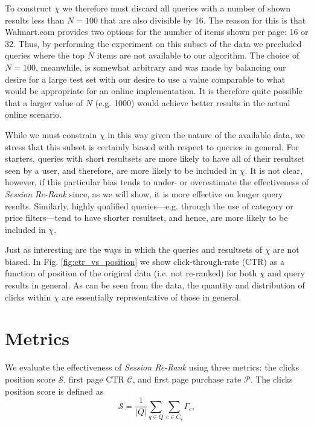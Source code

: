\documentclass{article}
\begin{document}
To construct $\chi$ we therefore must discard all queries with a number of
shown results less than $N=100$ that are also divisible by 16. The reason for 
this is that Walmart.com provides two options for the number of items shown per
page: 16 or 32. Thus, by performing the experiment on this subset of the data we
precluded queries where the top $N$ items are not available to our algorithm.
The choice of $N=100$, meanwhile, is somewhat arbitrary and was made by
balancing our desire for a large test set with our desire to use a value
comparable to what would be appropriate for an online implementation. It is
therefore quite possible that a
larger value of $N$ (e.g. 1000) would achieve better results in the actual
online scenario.

While we must constrain $\chi$ in this way given the nature of the available 
data, we stress that this subset is certainly biased with respect to queries 
in general. For starters, queries with short resultsets are more likely to 
have all of their resultset seen by a user, and therefore, are more likely to 
be included in $\chi$. It is not clear, however, if this particular bias
tends to under- or overestimate the effectiveness of {\em Session Re-Rank}
since, as we will show, it is more effective on longer query results. Similarly,
highly qualified queries---e.g. through the use of category or price
filters---tend to have shorter resultset, and hence, are more likely to be
included in $\chi$.

Just as interesting are the ways in which the queries and resultsets of $\chi$
are not biased. In Fig. \ref{fig:ctr_vs_position} we show click-through-rate (CTR)
as a function of position of the original data (i.e. not re-ranked) for both
$\chi$ and query results in general. As can be seen from the data, the quantity
and distribution of clicks within $\chi$ are essentially representative of those
in general.

\section{Metrics}

We evaluate the effectiveness of {\em Session Re-Rank} using three metrics: the 
clicks position score $\mathscr{S}$, first page CTR $\mathscr{C}$, and first page 
purchase rate $\mathscr{P}$. The clicks position score is defined
as
\begin{equation*}
    \mathscr{S} = \frac{1}{\left\vert{Q}\right\vert}\sum_{q \in Q}\sum_{c \in C_q}\Gamma_c,
\end{equation*}
\end{document}

